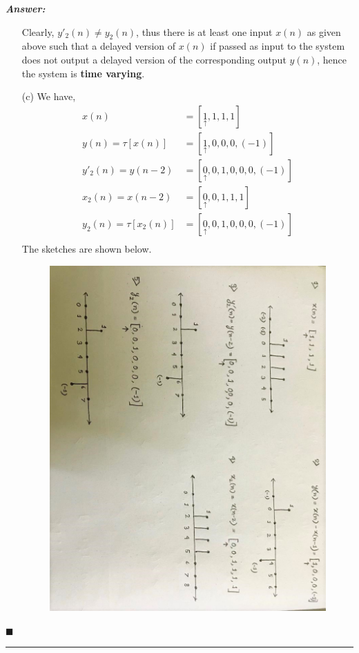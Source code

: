 \documentclass[12pt]{article}
\theoremstyle{definition}
\newenvironment{answer}{
    \textbf{\textit{Answer:}} \qquad
}{\hfill $\blacksquare$ \\ \begin{center}
    \rule{0.6\linewidth}{0.5px}    
\end{center}
}
\begin{document}
\begin{answer}
\begin{enumerate}
        Clearly, $y'_2(n) \neq y_2(n)$, thus there is at least one input $x(n)$ as given above such that a delayed version of $x(n)$ if passed as input to the system does not output a delayed version of the corresponding output $y(n)$, hence the system is \textbf{time varying}.

        \item[(c)] We have,
        \begin{align*}
            x(n) & = [\underset{\uparrow}{1}, 1, 1, 1]\\
            y(n) = \tau[x(n)] & = [\underset{\uparrow}{1}, 0, 0, 0, (-1)]\\
            y'_2(n) = y(n-2) & = [\underset{\uparrow}{0}, 0, 1, 0, 0, 0, (-1)]\\
            x_2(n) = x(n-2) & = [\underset{\uparrow}{0}, 0, 1, 1, 1]\\
            y_2(n) = \tau[x_2(n)] & = [\underset{\uparrow}{0}, 0, 1, 0, 0, 0, (-1)]\\
        \end{align*} 
        The sketches are shown below.
        \begin{figure}[H]
            \centering
            \includegraphics[height= \linewidth, angle = 90]{q10_c.jpeg}
        \end{figure}


\end{enumerate}
\end{answer}
\end{document}
